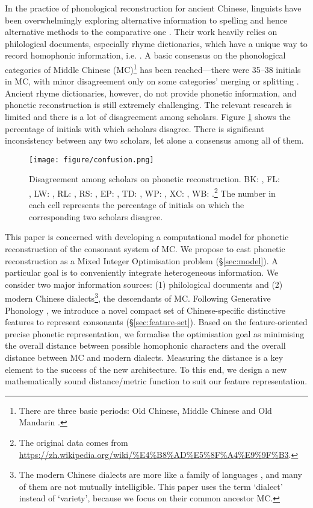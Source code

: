 In the practice of phonological reconstruction for ancient Chinese, linguists have been overwhelmingly exploring alternative information to spelling and hence alternative methods to the comparative one \citep[pp.1--2]{huang2014handbook}.
Their work heavily relies on philological documents, especially rhyme dictionaries, which have a unique way to record homophonic information, i.e. \fq. 
A basic consensus on the phonological categories of Middle Chinese (MC)\footnote{There are three basic periods: Old Chinese, Middle Chinese and Old Mandarin \citep{wangli-1957}.} has been reached---there were 35--38 initials in MC, with minor disagreement only on some categories' merging or splitting \citep{gbh,lr-1956,wangli-1957}.
Ancient rhyme dictionaries, however, do not provide phonetic information, and phonetic reconstruction is still extremely challenging.
The relevant research is limited and there is a lot of disagreement among scholars. 
Figure \ref{fig:confu-matrix} shows the percentage of initials with which scholars disagree. 
There is significant inconsistency between any two scholars, let alone a consensus among all of them.

\begin{figure}[t]
    \centering
    \texttt{[image: figure/confusion.png]}
    \caption{Disagreement among scholars on phonetic reconstruction. BK: \citet{gbh}, FL: \citet{lfk-1971}, 
    LW: \citet{wangli-1957}, RL: \citet{lr-1956}, RS: \citet{shaorongfen}, EP: \citet{pulleyblanks}, TD: \citet{dth-2004}, WP: \citet{panwuyun-2000}, XC: \citet{chenxinxiong}, WB: \citet{Baxter1992}.\footnote{The original data comes from \url{https://zh.wikipedia.org/wiki/\%E4\%B8\%AD\%E5\%8F\%A4\%E9\%9F\%B3}.} The number in each cell represents the percentage of initials on which the corresponding two scholars disagree. 
}
    \label{fig:confu-matrix}
\end{figure}

This paper is concerned with developing a computational model for phonetic reconstruction of the consonant system of MC.
We propose to cast phonetic reconstruction as a Mixed Integer Optimisation problem (\S\ref{sec:model}). 
A particular goal is to conveniently integrate heterogeneous information. 
We consider two major information sources: 
(1) philological documents and 
(2) modern Chinese dialects\footnote{The modern Chinese dialects are more like a family of languages \citep{huang2014handbook}, and many of them are not mutually intelligible. 
This paper uses the term `dialect' instead of `variety', because we focus on their common ancestor MC.}, the descendants of MC.
Following Generative Phonology \cite{chomsky-1968},
we introduce a novel compact set of Chinese-specific distinctive features to represent consonants (\S\ref{sec:feature-set}).
Based on the feature-oriented precise phonetic representation, we formalise 
the optimisation goal as minimising the overall distance between possible homophonic characters and the overall distance between MC and modern dialects.
Measuring the distance is a key element to the success of the new architecture.
To this end, we design a new mathematically sound distance/metric function to suit our feature representation.

